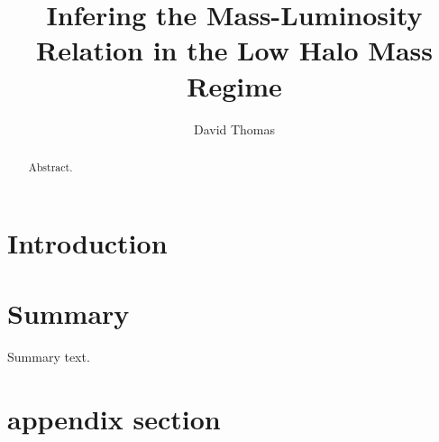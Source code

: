 \documentclass[twocolumn]{aastex61}
\begin{document}
\title{Infering the Mass-Luminosity Relation in the Low Halo Mass Regime}

\author{David Thomas}

\begin{abstract}
Abstract.
\end{abstract}


\section{Introduction}

\section{Summary}
Summary text.






\appendix
\section{appendix section}
\end{document}
